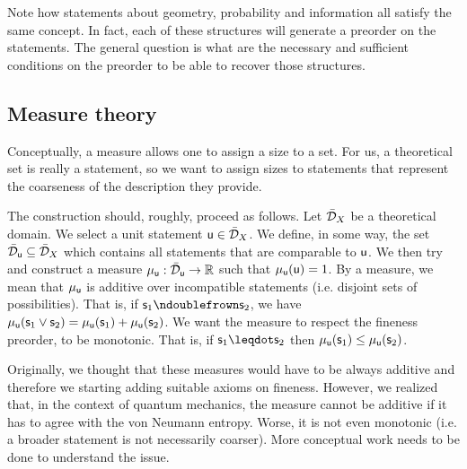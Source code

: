 \documentclass[11pt,letterpaper,fleqn]{memoir} %
\begin{document}
Note how statements about geometry, probability and information all satisfy the same concept. In fact, each of these structures will generate a preorder on the statements. The general question is what are the necessary and sufficient conditions on the preorder to be able to recover those structures.

\subsection{Measure theory}

Conceptually, a measure allows one to assign a size to a set. For us, a theoretical set is really a statement, so we want to assign sizes to statements that represent the coarseness of the description they provide.

The construction should, roughly, proceed as follows. Let $\tdomain_X$ be a theoretical domain. We select a unit statement $\stmt[u] \in \tdomain_X$. We define, in some way, the set $\tdomain_{\stmt[u]} \subseteq \tdomain_X$ which contains all statements that are comparable to $\stmt[u]$. We then try and construct a measure $\mu_{\stmt[u]} : \tdomain_{\stmt[u]} \to \mathbb{R}$ such that $\mu_{\stmt[u]}(\stmt[u]) = 1$. By a measure, we mean that $\mu_{\stmt[u]}$ is additive over incompatible statements (i.e. disjoint sets of possibilities). That is, if $\stmt_1 \ncomp \stmt_2$, we have $\mu_{\stmt[u]}(\stmt_1 \OR \stmt_2) = \mu_{\stmt[u]}(\stmt_1) + \mu_{\stmt[u]}(\stmt_2)$. We want the measure to respect the fineness preorder, to be monotonic. That is, if $\stmt_1 \finer \stmt_2$ then $\mu_{\stmt[u]}(\stmt_1) \leq \mu_{\stmt[u]}(\stmt_2)$.

Originally, we thought that these measures would have to be always additive and therefore we starting adding suitable axioms on fineness. However, we realized that, in the context of quantum mechanics, the measure cannot be additive if it has to agree with the von Neumann entropy. Worse, it is not even monotonic (i.e. a broader statement is not necessarily coarser). More conceptual work needs to be done to understand the issue.
\end{document}
